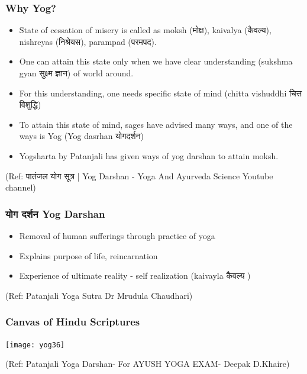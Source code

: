 \begin{frame}[fragile]\frametitle{Why Yog?}

	\begin{itemize}
	\item State of cessation of misery is called as moksh (मोक्ष), kaivalya (कैवल्य), nishreyas (निश्रेयस), parampad (परमपद).
	\item One can attain this state only when we have clear understanding (sukshma gyan सुक्ष्म ज्ञान) of world around.
	\item For this understanding, one needs specific state of mind (chitta vishuddhi चित्त विशुद्धि)
	\item To attain this state of mind, sages have advised many ways, and one of the ways is Yog (Yog dasrhan योगदर्शन)
	\item Yogsharta by Patanjali has given ways of yog darshan to attain moksh.
	\end{itemize}

\tiny{(Ref: पातंजल योग सूत्र | Yog Darshan - Yoga And Ayurveda Science Youtube channel)}

\end{frame}

\begin{frame}[fragile]\frametitle{ योग दर्शन Yog Darshan}

	\begin{itemize}
	\item Removal of human sufferings through practice of yoga
	\item Explains purpose of life, reincarnation
	\item Experience of ultimate reality - self realization (kaivayla कैवल्य )
	\end{itemize}

\tiny{(Ref: Patanjali Yoga Sutra Dr Mrudula Chaudhari)}

\end{frame}

\begin{frame}[fragile]\frametitle{Canvas of Hindu Scriptures}

\begin{center}
\texttt{[image: yog36]}

\end{center}

  
  \tiny{(Ref: Patanjali Yoga Darshan- For AYUSH YOGA EXAM- Deepak D.Khaire)}

\end{frame}


